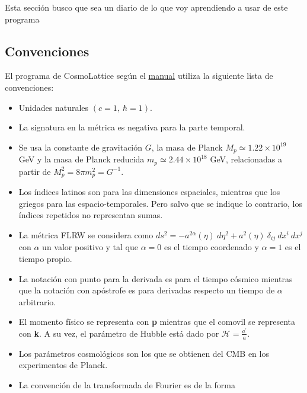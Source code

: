Esta sección busco que sea un diario de lo que voy aprendiendo a usar de este programa

\subsection{Convenciones}

El programa de CosmoLattice según el \href{https://arxiv.org/pdf/2102.01031}{manual} utiliza la siguiente lista de convenciones:

\begin{itemize}
    \item Unidades naturales $(c = 1, \ \hbar = 1)$.

    \item La signatura en la métrica es negativa para la parte temporal.

    \item Se usa la constante de gravitación $G$, la masa de Planck $M_p \simeq 1.22 \times 10^{19}$ GeV y la masa de Planck reducida $m_p \simeq 2.44 \times 10^{18}$ GeV, relacionadas a partir de $M_p^2 = 8 \pi m_p^2 = G^{-1}$.

    \item Los índices latinos son para las dimensiones espaciales, mientras que los griegos para las espacio-temporales. Pero salvo que se indique lo contrario, los índices repetidos no representan sumas.

    \item La métrica FLRW se considera como $ds^2 = - a^{2 \alpha} (\eta) \ d\eta^2 + a^2(\eta) \ \delta_{ij} \ dx^i \ dx^j$ con $\alpha$ un valor positivo y tal que $\alpha = 0$ es el tiempo coordenado y $\alpha = 1$ es el tiempo propio.

    \item La notación con punto para la derivada es para el tiempo cósmico mientras que la notación con apóstrofe es para derivadas respecto un tiempo de $\alpha$ arbitrario.

    \item El momento físico se representa con \textbf{p} mientras que el comovil se representa con \textbf{k}. A su vez, el parámetro de Hubble está dado por $\displaystyle \mathcal{H} = \frac{a^\prime}{a}$.

    \item Los parámetros cosmológicos son los que se obtienen del CMB en los experimentos de Planck.

    \item La convención de la transformada de Fourier es de la forma


\end{itemize}
